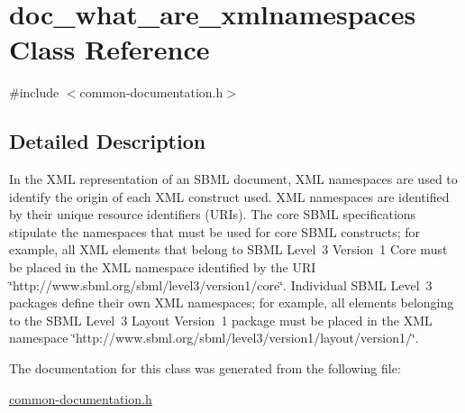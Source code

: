 \hypertarget{classdoc__what__are__xmlnamespaces}{}\section{doc\+\_\+what\+\_\+are\+\_\+xmlnamespaces Class Reference}
\label{classdoc__what__are__xmlnamespaces}


{\ttfamily \#include $<$common-\/documentation.\+h$>$}



\subsection{Detailed Description}
\begin{DoxyParagraph}{}
In the X\+ML representation of an S\+B\+ML document, X\+ML namespaces are used to identify the origin of each X\+ML construct used. X\+ML namespaces are identified by their unique resource identifiers (U\+R\+Is). The core S\+B\+ML specifications stipulate the namespaces that must be used for core S\+B\+ML constructs; for example, all X\+ML elements that belong to S\+B\+ML Level~3 Version~1 Core must be placed in the X\+ML namespace identified by the U\+RI {\ttfamily \char`\"{}http\+://www.\+sbml.\+org/sbml/level3/version1/core\char`\"{}}. Individual S\+B\+ML Level~3 packages define their own X\+ML namespaces; for example, all elements belonging to the S\+B\+ML Level~3 Layout Version~1 package must be placed in the X\+ML namespace {\ttfamily \char`\"{}http\+://www.\+sbml.\+org/sbml/level3/version1/layout/version1/\char`\"{}}. 
\end{DoxyParagraph}


The documentation for this class was generated from the following file\+:\begin{DoxyCompactItemize}
\item 
\hyperlink{common-documentation_8h}{common-\/documentation.\+h}\end{DoxyCompactItemize}
